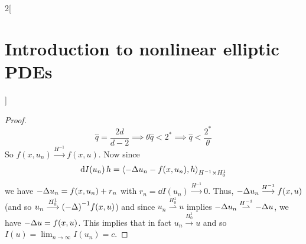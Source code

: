 \documentclass[../../../main_math.tex]{subfiles}
\begin{document}
\begin{multicols}{2}[\section{Introduction to nonlinear elliptic PDEs}]
\begin{proof}
    $$
      \hat{q}=\frac{2d}{d-2}\implies \theta\hat{q}<2^*\implies \hat{q}<\frac{2^*}{\theta}
    $$
    So $f(x,u_n)\overset{H^{-1}}{\longrightarrow} f(x,u)$. Now since
    $$
      \dd{I(u_n)}h={\langle -\Delta u_n-f(x,u_n),h\rangle}_{H^{-1}\times H_0^1}
    $$
    we have $-\Delta u_n=f(x,u_n)+r_n$ with $r_n=\dd{I(u_n)}\overset{H^{-1}}{\longrightarrow} 0$. Thus, $-\Delta u_n\overset{H^{-1}}{\longrightarrow} f(x,u)$ (and so $u_n\overset{H_0^1}{\longrightarrow} {(-\Delta)}^{-1}f(x,u)$) and since $u_n\overset{H_0^1}{\rightharpoonup} u$ implies $-\Delta u_n\overset{H^{-1}}{\rightharpoonup} -\Delta u$, we have $-\Delta u=f(x,u)$. This implies that in fact $u_n\overset{H_0^1}{\longrightarrow}u$ and so $I(u)=\displaystyle \lim_{n\to\infty}I(u_n)=c$.
  \end{proof}
\end{multicols}
\end{document}

